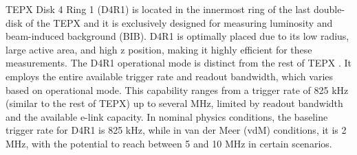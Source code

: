 TEPX Disk 4 Ring 1 (D4R1) is located in the innermost ring of the last double-disk of the TEPX and it is exclusively designed for measuring luminosity and beam-induced background (BIB). D4R1 is optimally placed due to its low radius, large active area, and high z position, making it highly efficient for these measurements. The D4R1 operational mode is distinct from the rest of TEPX \cite{Haranko2023}. It employs the entire available trigger rate and readout bandwidth, which varies based on operational mode. This capability ranges from a trigger rate of 825 kHz (similar to the rest of TEPX) up to several MHz, limited by readout bandwidth and the available e-link capacity. In nominal physics conditions, the baseline trigger rate for D4R1 is 825 kHz, while in van der Meer (vdM) conditions, it is 2 MHz, with the potential to reach between 5 and 10 MHz in certain scenarios. 



